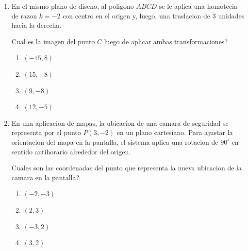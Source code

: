 \documentclass[12pt]{article}
\begin{document}
\begin{enumerate}[label=\textbf{\arabic*.}, itemsep=1.1cm]
\Needspace{0.52\textheight}
\item
En el mismo plano de diseno, al poligono $ABCD$ se le aplica una homotecia de razon $k=-2$ con centro en el origen y, luego, una traslacion de $3$ unidades hacia la derecha.

\textquestiondown Cual es la imagen del punto $C$ luego de aplicar ambas transformaciones?

\begin{enumerate}[label=\Alph*)]
  \item $(-15,8)$
  \item $(15,-8)$
  \item $(9,-8)$
  \item $(12,-5)$
\end{enumerate}

\Needspace{0.48\textheight}
\item
En una aplicacion de mapas, la ubicacion de una camara de seguridad se representa por el punto $P(3,-2)$ en un plano cartesiano. Para ajustar la orientacion del mapa en la pantalla, el sistema aplica una rotacion de $90^\circ$ en sentido antihorario alrededor del origen.

\textquestiondown Cuales son las coordenadas del punto que representa la nueva ubicacion de la camara en la pantalla?

\begin{enumerate}[label=\Alph*)]
  \item $(-2,-3)$
  \item $(2,3)$
  \item $(-3,2)$
  \item $(3,2)$
\end{enumerate}

\end{enumerate}
\end{document}

